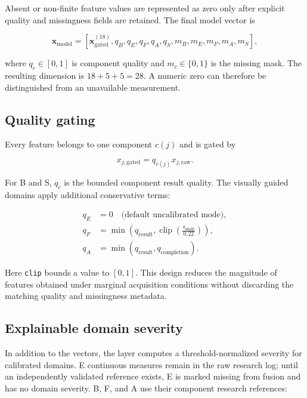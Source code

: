 \documentclass[11pt,a4paper]{article}
\begin{document}
Absent or non-finite feature values are represented as zero only after explicit quality and missingness fields are retained. The final model vector is

\begin{equation}
\mathbf{x}_{\mathrm{model}}=
\left[
\mathbf{x}_{\mathrm{gated}}^{(18)},
q_B,q_E,q_F,q_A,q_S,
m_B,m_E,m_F,m_A,m_S
\right],
\end{equation}

where $q_c\in[0,1]$ is component quality and $m_c\in\{0,1\}$ is the missing mask. The resulting dimension is $18+5+5=28$. A numeric zero can therefore be distinguished from an unavailable measurement.

\subsection{Quality gating}

Every feature belongs to one component $c(j)$ and is gated by

\begin{equation}
x_{j,\mathrm{gated}}=q_{c(j)}x_{j,\mathrm{raw}}.
\end{equation}

For B and S, $q_c$ is the bounded component result quality. The visually guided domains apply additional conservative terms:

\begin{align}
q_E &= 0 \quad \text{(default uncalibrated mode)},\\
q_F &= \min\left(q_{\mathrm{result}},
\operatorname{clip}\left(\frac{s_{\mathrm{smile}}}{0.22}\right)\right),\\
q_A &= \min\left(q_{\mathrm{result}},q_{\mathrm{completion}}\right).
\end{align}

Here \texttt{clip} bounds a value to $[0,1]$. This design reduces the magnitude of features obtained under marginal acquisition conditions without discarding the matching quality and missingness metadata.

\subsection{Explainable domain severity}

In addition to the vectors, the layer computes a threshold-normalized severity for calibrated domains. E continuous measures remain in the raw research log; until an independently validated reference exists, E is marked missing from fusion and has no domain severity. B, F, and A use their component research references:
\end{document}
